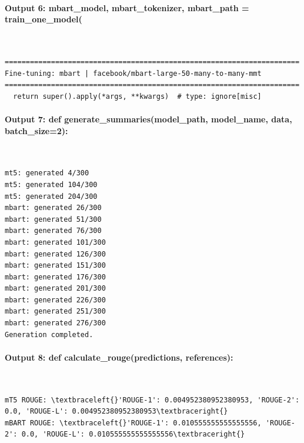 \documentclass[12pt,a4paper,oneside]{report}
\begin{document}
\paragraph{Output 6: mbart\_model, mbart\_tokenizer, mbart\_path = train\_one\_model(}\mbox{}\\[-1ex]
\begin{Verbatim}[commandchars=\\\{\},breaklines=true,breakanywhere=true,fontsize=\scriptsize,frame=leftline,framesep=2mm,rulecolor=\color{gray}]
======================================================================
Fine-tuning: mbart | facebook/mbart-large-50-many-to-many-mmt
======================================================================
  return super().apply(*args, **kwargs)  # type: ignore[misc]
\end{Verbatim}
\paragraph{Output 7: def generate\_summaries(model\_path, model\_name, data, batch\_size=2):}\mbox{}\\[-1ex]
\begin{Verbatim}[commandchars=\\\{\},breaklines=true,breakanywhere=true,fontsize=\scriptsize,frame=leftline,framesep=2mm,rulecolor=\color{gray}]
mt5: generated 4/300
mt5: generated 104/300
mt5: generated 204/300
mbart: generated 26/300
mbart: generated 51/300
mbart: generated 76/300
mbart: generated 101/300
mbart: generated 126/300
mbart: generated 151/300
mbart: generated 176/300
mbart: generated 201/300
mbart: generated 226/300
mbart: generated 251/300
mbart: generated 276/300
Generation completed.
\end{Verbatim}
\paragraph{Output 8: def calculate\_rouge(predictions, references):}\mbox{}\\[-1ex]
\begin{Verbatim}[commandchars=\\\{\},breaklines=true,breakanywhere=true,fontsize=\scriptsize,frame=leftline,framesep=2mm,rulecolor=\color{gray}]
mT5 ROUGE: \textbraceleft{}'ROUGE-1': 0.004952380952380953, 'ROUGE-2': 0.0, 'ROUGE-L': 0.004952380952380953\textbraceright{}
mBART ROUGE: \textbraceleft{}'ROUGE-1': 0.010555555555555556, 'ROUGE-2': 0.0, 'ROUGE-L': 0.010555555555555556\textbraceright{}
\end{Verbatim}
\end{document}
